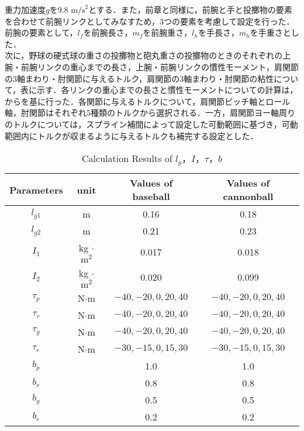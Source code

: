 重力加速度$g$を9.8 $\mathrm{m/s}^{2}$とする．また，前章と同様に，前腕と手と投擲物の要素を合わせて前腕リンクとしてみなすため，3つの要素を考慮して設定を行った．
前腕の要素として，$l_{f}$を前腕長さ，$m_{f}$を前腕重さ，$l_{h}$を手長さ，$m_{h}$を手重さとした．\\

次に，野球の硬式球の重さの投擲物と砲丸重さの投擲物のときのそれぞれの上腕・前腕リンクの重心までの長さ，上腕・前腕リンクの慣性モーメント，肩関節の3軸まわり・肘関節に与えるトルク，肩関節の3軸まわり・肘関節の粘性について，表に示す．各リンクの重心までの長さと慣性モーメントについての計算は，からを基に行った．各関節に与えるトルクについて，肩関節ピッチ軸とロール軸，肘関節はそれぞれ5種類のトルクから選択される．一方，肩関節ヨー軸周りのトルクについては，スプライン補間によって設定した可動範囲に基づき，可動範囲内にトルクが収まるように与えるトルクも補完する設定とした．

\begin{table}[tb]
  \begin{center}
    \caption{Calculation Results of $l_{g}$，$I$，$\tau$，$b$}

    \begin{tabular}{c|c|c|c}
      \hline
      Parameters & unit & Values of baseball & Values of cannonball \\
      \hline
      $l_{g1}$ & m & 0.16 & 0.18 \\
      $l_{g2}$ & m & 0.21 & 0.23 \\
      $I_{1}$ & kg $\cdot$ $\mathrm{m}^2$ & 0.017 & 0.018 \\
      $I_{2}$ & kg $\cdot$ $\mathrm{m}^2$ & 0.020 & 0.099 \\
      $\tau_{p}$ & N$\cdot$m & $-40, -20, 0, 20, 40$ & $-40, -20, 0, 20, 40$ \\
      $\tau_{r}$ & N$\cdot$m & $-40, -20, 0, 20, 40$ & $-40, -20, 0, 20, 40$ \\
      $\tau_{y}$ & N$\cdot$m & $-40, -20, 0, 20, 40$ & $-40, -20, 0, 20, 40$ \\
      $\tau_{e}$ & N$\cdot$m & $-30, -15, 0, 15, 30$ & $-30, -15, 0, 15, 30$ \\
      $b_{p}$ &  & 1.0 & 1.0\\
      $b_{r}$ &  & 0.8 & 0.8\\
      $b_{y}$ &  & 0.5 & 0.5\\
      $b_{e}$ &  & 0.2 & 0.2\\
      \hline
    \end{tabular}
  \end{center}
\end{table}

